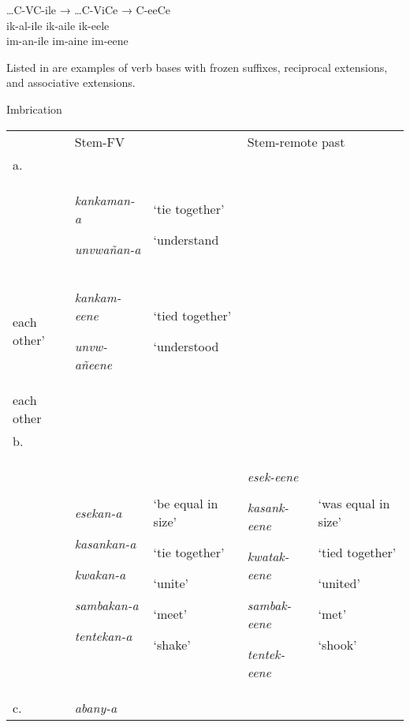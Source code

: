 \documentclass[output=paper]{langsci/langscibook}
\begin{document}
\ea
 …C-VC-ile  →  …C-ViCe  →  C-eeCe   \\
\gll ik-al-ile        ik-aile    ik-eele\\
 im-an-ile        im-aine    im-eene\\
\z

Listed in  are examples of verb bases with frozen suffixes, reciprocal extensions, and associative extensions.

\begin{table}
\caption{Imbrication}
\label{tab:20}
\end{table}

\begin{tabularx}{\textwidth}{XXXXX} & \multicolumn{2}{l}{Stem-FV} & \multicolumn{2}{l}{Stem-remote past}\\
\lsptoprule
a. \\ & {\emph{kankaman-a}}

\emph{unvwañan-a} & {‘tie together’}

‘understand\\
  each other’ & {\emph{kankam-eene}}

\emph{unvw-añeene} & {‘tied together’}

‘understood\\
  each other\\
b.\\ & {\emph{esekan-a}}

{\emph{kasankan-a}}

{\emph{kwakan-a}}

{\emph{sambakan-a}}

\emph{tentekan-a} & {‘be equal in size’}

{‘tie together’}

{‘unite’}

{‘meet’}

‘shake’ & {\emph{esek-eene}}

{\emph{kasank-eene}}

{\emph{kwatak-eene}}

{\emph{sambak-eene}}

\emph{tentek-eene} & {‘was equal in size’}

{‘tied together’}

{‘united’}

{‘met’}

‘shook’\\
c. & {\emph{abany-a}}


\end{tabularx}
\end{document}

